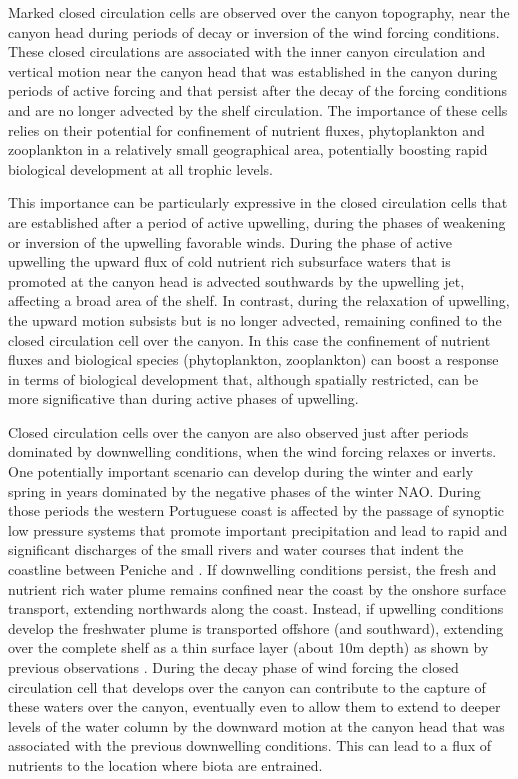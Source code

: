 Marked closed circulation cells are observed over the canyon
topography, near the canyon head during periods of decay or inversion
of the wind forcing conditions. These closed circulations are
associated with the inner canyon circulation and vertical motion near
the canyon head that was established in the canyon during periods
of active forcing and that persist after the decay of the forcing
conditions and are no longer advected by the shelf circulation. The
importance of these cells relies on their potential for confinement of
nutrient fluxes, phytoplankton and zooplankton in a relatively small
geographical area, potentially boosting rapid biological development
at all trophic levels.

This importance can be particularly expressive in the closed
circulation cells that are established after a period of active
upwelling, during the phases of weakening or inversion of the
upwelling favorable winds. During the phase of active upwelling the
upward flux of cold nutrient rich subsurface waters that is
promoted at the canyon head is advected southwards by the upwelling
jet, affecting a broad area of the shelf. In contrast, during the
relaxation of upwelling, the upward motion subsists but is no longer
advected, remaining confined to the closed circulation cell over the
canyon. In this case the confinement of nutrient fluxes and biological
species (phytoplankton, zooplankton) can boost a response in terms of
biological development that, although spatially restricted, can be
more significative than during active phases of upwelling.

Closed circulation cells over the canyon are also observed just after
periods dominated by downwelling conditions, when the wind forcing
relaxes or inverts. One potentially important scenario can develop
during the winter and early spring in years dominated by the negative
phases of the winter NAO. During those periods the western Portuguese
coast is affected by the passage of synoptic low pressure systems that
promote important precipitation and lead to rapid and significant
discharges of the small rivers and water courses that indent the
coastline between Peniche and \naze.  If downwelling conditions
persist, the fresh and nutrient rich water plume remains confined near
the coast by the onshore surface transport, extending northwards along
the coast. Instead, if upwelling conditions develop the freshwater
plume is transported offshore (and southward), extending over the
complete shelf as a thin surface layer (about 10m depth) as shown by
previous observations \cite{martins10}. During the decay phase of wind
forcing the closed circulation cell that develops over the canyon can
contribute to the capture of these waters over the canyon, eventually
even to allow them to extend to deeper levels of the water column by
the downward motion at the canyon head that was associated with the
previous downwelling conditions. This can lead to a flux of nutrients
to the location where biota are entrained.


